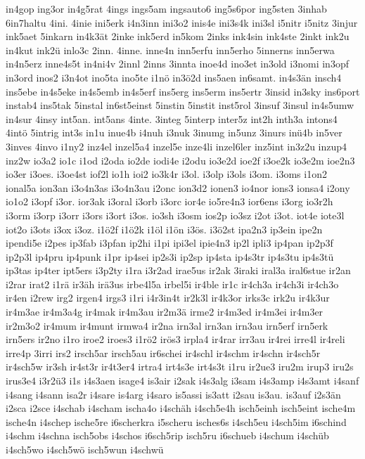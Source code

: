 {in4gop
ing3or
in4g5rat
4ings
ings5am
ingsauto6
ing5s6por
ing5sten
3inhab
6in7haltu
4ini.
4inie
ini5erk
i4n3inn
ini3o2
inis4e
ini3s4k
ini3sl
i5nitr
i5nitz
3injur
ink5aet
5inkarn
in4k3ät
2inke
ink5erd
in5kom
2inks
ink4sin
ink4ste
2inkt
ink2u
in4kut
ink2ü
inlo3c
2inn.
4inne.
inne4n
inn5erfu
inn5erho
5innerns
inn5erwa
in4n5erz
inne4s5t
in4ni4v
2innl
2inns
3innta
inoe4d
ino3et
in3old
i3nomi
in3opf
in3ord
inos2
i3n4ot
ino5ta
ino5te
i1nö
in3ö2d
ins5aen
in6samt.
in4s3än
insch4
ins5ebe
in4s5eke
in4s5emb
in4s5erf
ins5erg
ins5erm
ins5ertr
3insid
in3sky
ins6port
instab4
ins5tak
5instal
in6st5einst
5instin
5instit
inst5rol
3insuf
3insul
in4s5umw
in4sur
4insy
int5an.
int5ans
4inte.
3integ
5interp
inter5z
int2h
inth3a
intons4
4intö
5intrig
int3s
in1u
inue4b
i4nuh
i3nuk
3inumg
in5unz
3inurs
inü4b
in5ver
3inves
4invo
i1ny2
inz4el
inzel5a4
inzel5e
inze4li
inzel6ler
inz5int
in3z2u
inzup4
inz2w
io3a2
io1c
i1od
i2oda
io2de
iodi4e
i2odu
io3e2d
ioe2f
i3oe2k
io3e2m
ioe2n3
io3er
i3oes.
i3oe4st
iof2l
io1h
ioi2
io3k4r
i3ol.
i3olp
i3ols
i3om.
i3oms
i1on2
ional5a
ion3an
i3o4n3as
i3o4n3au
i2onc
ion3d2
ionen3
io4nor
ions3
ionsa4
i2ony
io1o2
i3opf
i3or.
ior3ak
i3oral
i3orb
i3orc
ior4e
io5re4n3
ior6ens
i3org
io3r2h
i3orm
i3orp
i3orr
i3ors
i3ort
i3os.
io3sh
i3osm
ios2p
io3sz
i2ot
i3ot.
iot4e
iote3l
iot2o
i3ots
i3ox
i3oz.
i1ö2f
i1ö2k
i1öl
i1ön
i3ös.
i3ö2st
ipa2n3
ip3ein
ipe2n
ipendi5e
i2pes
ip3fab
i3pfan
ip2hi
i1pi
ipi3el
ipie4n3
ip2l
ipli3
ip4pan
ip2p3f
ip2p3l
ip4pru
ip4punk
i1pr
ip4sei
ip2s3i
ip2sp
ip4sta
ip4s3tr
ip4s3tu
ip4s3tü
ip3tas
ip4ter
ipt5ers
i3p2ty
i1ra
i3r2ad
irae5us
ir2ak
3iraki
iral3a
iral6stue
ir2an
i2rar
irat2
i1rä
ir3äh
irä3us
irbe4l5a
irbel5i
ir4ble
ir1c
ir4ch3a
ir4ch3i
ir4ch3o
ir4en
i2rew
irg2
irgen4
irgs3
i1ri
i4r3in4t
ir2k3l
ir4k3or
irks3c
irk2u
ir4k3ur
ir4m3ae
ir4m3a4g
ir4mak
ir4m3au
ir2m3ä
irme2
ir4m3ed
ir4m3ei
ir4m3er
ir2m3o2
ir4mum
ir4munt
irmwa4
ir2na
irn3al
irn3an
irn3au
irn5erf
irn5erk
irn5ers
ir2no
i1ro
iroe2
iroes3
i1rö2
irös3
irpla4
ir4rar
irr3au
ir4rei
irre4l
ir4reli
irre4p
3irri
irs2
irsch5ar
irsch5au
ir6schei
ir4schl
ir4schm
ir4schn
ir4sch5r
ir4sch5w
ir3sh
ir4st3r
ir4t3er4
irtra4
irt4s3e
irt4s3t
i1ru
ir2ue3
iru2m
irup3
iru2s
irus3e4
i3r2ü3
i1s
i4s3aen
isage4
is3air
i2sak
i4s3alg
i3sam
i4s3amp
i4s3amt
i4sanf
i4sang
i4sann
isa2r
i4sare
is4arg
i4saro
is5assi
is3att
i2sau
is3au.
is3auf
i2s3än
i2sca
i2sce
i4schab
i4scham
ischa4o
i4schäh
i4sch5e4h
isch5einh
isch5eint
ische4m
ische4n
i4schep
ische5re
i6scherkra
i5scheru
isches6s
i4sch5eu
i4sch5im
i6schind
i4schm
i4schna
isch5obs
i4schos
i6sch5rip
isch5ru
i6schueb
i4schum
i4schüb
i4sch5wo
i4sch5wö
isch5wun
i4schwü
}
